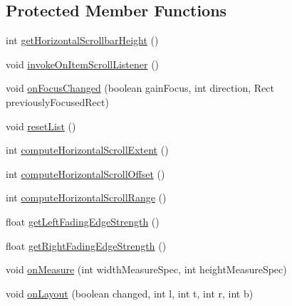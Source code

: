 \subsection*{Protected Member Functions}
\begin{DoxyCompactItemize}
\item 
int \hyperlink{classit_1_1sephiroth_1_1android_1_1library_1_1widget_1_1_abs_h_list_view_a00bd58b2fc6f15471b0a80201397e661}{get\+Horizontal\+Scrollbar\+Height} ()
\item 
void \hyperlink{classit_1_1sephiroth_1_1android_1_1library_1_1widget_1_1_abs_h_list_view_ae828c581d514f826d42c91bc5737d286}{invoke\+On\+Item\+Scroll\+Listener} ()
\item 
void \hyperlink{classit_1_1sephiroth_1_1android_1_1library_1_1widget_1_1_abs_h_list_view_a1f957f9693c4e702ba458d56325f6ab4}{on\+Focus\+Changed} (boolean gain\+Focus, int direction, Rect previously\+Focused\+Rect)
\item 
void \hyperlink{classit_1_1sephiroth_1_1android_1_1library_1_1widget_1_1_abs_h_list_view_aaecf0281781265a2d8bbc1f7e05dfcca}{reset\+List} ()
\item 
int \hyperlink{classit_1_1sephiroth_1_1android_1_1library_1_1widget_1_1_abs_h_list_view_a3159935a156db30cdc4ed643263a98fd}{compute\+Horizontal\+Scroll\+Extent} ()
\item 
int \hyperlink{classit_1_1sephiroth_1_1android_1_1library_1_1widget_1_1_abs_h_list_view_a59b90188bde9fb4fb780573d6c3fb48e}{compute\+Horizontal\+Scroll\+Offset} ()
\item 
int \hyperlink{classit_1_1sephiroth_1_1android_1_1library_1_1widget_1_1_abs_h_list_view_a9ef2cc93326aba4fa9e9a250dcf6f8d4}{compute\+Horizontal\+Scroll\+Range} ()
\item 
float \hyperlink{classit_1_1sephiroth_1_1android_1_1library_1_1widget_1_1_abs_h_list_view_a60cb33888518e28cb17ab71f43307e0d}{get\+Left\+Fading\+Edge\+Strength} ()
\item 
float \hyperlink{classit_1_1sephiroth_1_1android_1_1library_1_1widget_1_1_abs_h_list_view_a29f6a1e0ace48b46506ccdd49622ef53}{get\+Right\+Fading\+Edge\+Strength} ()
\item 
void \hyperlink{classit_1_1sephiroth_1_1android_1_1library_1_1widget_1_1_abs_h_list_view_a7d0590f8b4f6344defd3eb04c172b44e}{on\+Measure} (int width\+Measure\+Spec, int height\+Measure\+Spec)
\item 
void \hyperlink{classit_1_1sephiroth_1_1android_1_1library_1_1widget_1_1_abs_h_list_view_a2f67bd979103fd8362bfcf0aaa93dab3}{on\+Layout} (boolean changed, int l, int t, int r, int b)

\end{DoxyCompactItemize}
